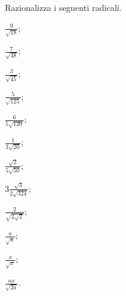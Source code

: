 \begin{esercizio}
 \label{ese:2.85}
Razionalizza i seguenti radicali.
 \begin{multicols}{4}
 \begin{enumeratea}
 \item $\frac 9{\sqrt{18}}$;
 \item $\frac 7{\sqrt{48}}$;
 \item $\frac 3{\sqrt{45}}$;
 \item $\frac 5{\sqrt{125}}$;
 \item $\frac 6{5\sqrt{120}}$;
 \item $\frac 1{3\sqrt{20}}$;
 \item $\frac{\sqrt 2}{5\sqrt{50}}$;
 \item $3\frac{\sqrt 3}{2\sqrt{324}}$;
 \item $\frac 2{\sqrt{2\sqrt 2}}$;
 \item $\frac a{\sqrt a}$;
 \item $\frac x{\sqrt x}$;
 \item $\frac{ax}{\sqrt{2a}}$.
 \end{enumeratea}
 \end{multicols}
\end{esercizio}

